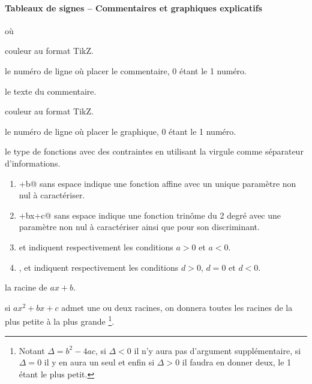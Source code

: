 \documentclass[12pt,a4paper]{article}
\begin{document}
\paragraph{Tableaux de signes -- Commentaires et graphiques explicatifs}

  où \quad {}


\IDoption{} couleur au format TikZ.


 le numéro de ligne où placer le commentaire, $0$ étant le 1\ier{} numéro.

 le texte du commentaire.


\separation




\IDoption{} couleur au format TikZ.


 le numéro de ligne où placer le graphique, $0$ étant le 1\ier{} numéro.


 le type de fonctions avec des contraintes en utilisant la virgule comme séparateur d'informations.

\begin{enumerate}
	\item \verb@ax+b@ sans espace indique une fonction affine avec un unique paramètre \verb@a@ non nul à caractériser.

	\item {}+bx+c@ sans espace indique une fonction trinôme du 2\ieme{} degré avec une paramètre \verb@a@ non nul à caractériser ainsi que \verb@d@ pour son discriminant.


	\smallskip
	
	\item \verb@ap@ et \verb@an@ indiquent respectivement les conditions $a > 0$ et $a < 0$.

	\item \verb@dp@, \verb@dz@ et \verb@dn@ indiquent respectivement les conditions $d > 0$, $d = 0$ et $d < 0$.
\end{enumerate}


 la racine de $ax + b$.


 si $ax^2 + bx + c$ admet une ou deux racines, on donnera toutes les racines de la plus petite à la plus grande
\footnote{
	Notant $\Delta = b^2 - 4 ac$, si $\Delta < 0$ il n'y aura pas d'argument supplémentaire, si $\Delta = 0$ il y en aura un seul et enfin si $\Delta > 0$ il faudra en donner deux, le 1\ier{} étant le plus petit.
}.
\end{document}
